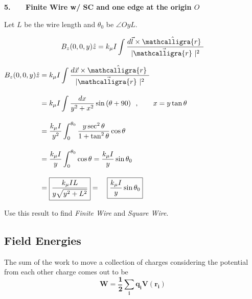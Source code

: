 \documentclass[12pt]{article}
\newcommand{\scripty}[1]{\ensuremath{\mathcalligra{#1}}}
\newcommand*{\cursrr}{\scripty{r}\ }
\begin{document}
\begin{minipage}[t]{.48\textwidth}
	\textbf{5. \ \ \ Finite Wire w/ SC and one edge at the origin \(O\)}
	
	\vspace{10pt}	
	Let \(L\) be the wire length and \(\theta_0\) be \(\angle OyL\).

	\vspace{5pt}
	\[ \displaystyle B_z(0,0,y) \hat{z} = k_\mu I \int \frac{ d\vec{l} \times \hat{\cursrr} }{| \vec{\cursrr} |^2}\]

	\vspace{10pt}
	\(\begin{aligned}
		B_z(0,0,y) \hat{z}&= k_\mu I \int \frac{ d\vec{x} \times \hat{\cursrr} }{| \vec{\cursrr} |^2}\\[10pt]
		&= k_\mu I \int \frac{dx}{y^2 + x^2} \sin{(\theta+90)}
			\ \ , \hspace{20pt} x = y \tan{\theta}\\[10pt]
			&= \frac{k_\mu I}{y^2} \int_0^{\theta_0} \frac{y \sec^2{\theta}}{1 + \tan^2{\theta}} \cos{\theta}\\[10pt]
			&= \frac{k_\mu I}{y} \int_0^{\theta_0} \cos{\theta} = \frac{k_\mu I}{y} \sin{\theta_0} \\[10pt]
			&= \boxed{ \frac{k_\mu I L}{y \sqrt{y^2+L^2}} } = \quad \boxed{ \frac{k_\mu I}{y} \sin{\theta_0}}
	\end{aligned}\)

	\vspace{30pt}
	Use this result to find \textit{Finite Wire} and \textit{Square Wire}.
\end{minipage}

%
%
\newpage
\subsection{Field Energies}
The sum of the work to move a collection of charges considering 
the potential from each other charge comes out to be
\[ \boldsymbol{ W = \frac{1}{2} \sum_i q_i V(r_i) } \]
\end{document}
